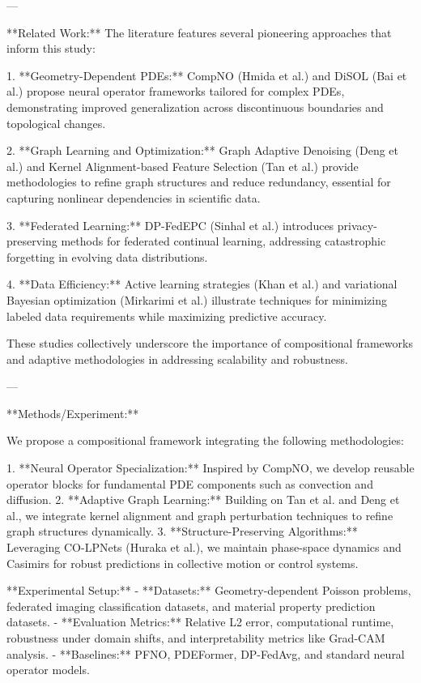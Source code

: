 ---

**Related Work:**  
The literature features several pioneering approaches that inform this study:  

1. **Geometry-Dependent PDEs:** CompNO (Hmida et al.) and DiSOL (Bai et al.) propose neural operator frameworks tailored for complex PDEs, demonstrating improved generalization across discontinuous boundaries and topological changes.  

2. **Graph Learning and Optimization:** Graph Adaptive Denoising (Deng et al.) and Kernel Alignment-based Feature Selection (Tan et al.) provide methodologies to refine graph structures and reduce redundancy, essential for capturing nonlinear dependencies in scientific data.  

3. **Federated Learning:** DP-FedEPC (Sinhal et al.) introduces privacy-preserving methods for federated continual learning, addressing catastrophic forgetting in evolving data distributions.  

4. **Data Efficiency:** Active learning strategies (Khan et al.) and variational Bayesian optimization (Mirkarimi et al.) illustrate techniques for minimizing labeled data requirements while maximizing predictive accuracy.  

These studies collectively underscore the importance of compositional frameworks and adaptive methodologies in addressing scalability and robustness.  

---

**Methods/Experiment:**  

We propose a compositional framework integrating the following methodologies:  

1. **Neural Operator Specialization:** Inspired by CompNO, we develop reusable operator blocks for fundamental PDE components such as convection and diffusion.  
2. **Adaptive Graph Learning:** Building on Tan et al. and Deng et al., we integrate kernel alignment and graph perturbation techniques to refine graph structures dynamically.  
3. **Structure-Preserving Algorithms:** Leveraging CO-LPNets (Huraka et al.), we maintain phase-space dynamics and Casimirs for robust predictions in collective motion or control systems.  

**Experimental Setup:**  
- **Datasets:** Geometry-dependent Poisson problems, federated imaging classification datasets, and material property prediction datasets.  
- **Evaluation Metrics:** Relative L2 error, computational runtime, robustness under domain shifts, and interpretability metrics like Grad-CAM analysis.  
- **Baselines:** PFNO, PDEFormer, DP-FedAvg, and standard neural operator models.  

